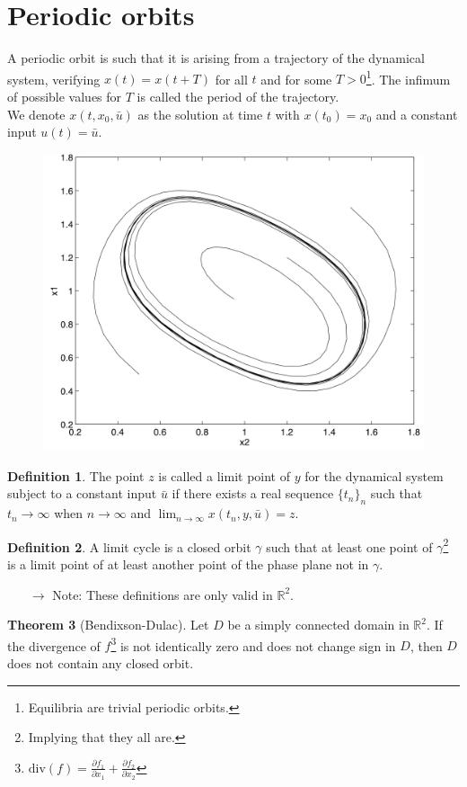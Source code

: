 \documentclass[12pt, openany]{report}
\theoremstyle{definition}
\newtheorem{thm}{Theorem}[chapter]
\newtheorem{definition}[thm]{Definition}
\newcommand{\R}{\mathbb{R}}
\begin{document}
\section{Periodic orbits}
A periodic orbit is such that it is arising from a trajectory of the dynamical system, verifying \(x(t)=x(t+T)\) for all \(t\) and for some \(T>0\)\footnote{Equilibria are trivial periodic orbits.}. The infimum of possible values for \(T\) is called the period of the trajectory.\\
We denote \(x(t,x_0,\bar u)\) as the solution at time \(t\) with \(x(t_0)=x_0\) and a constant input \(u(t) = \bar u\).
\begin{figure}[H]
    \centering
    \includegraphics[width = .5\textwidth]{img/limit_cycle.png}
\end{figure}
\begin{definition}
    The point \(z\) is called a limit point of \(y\) for the dynamical system subject to a constant input \(\bar u\) if there exists a real sequence \(\{t_n\}_n\) such that \(t_n\rightarrow\infty\) when \(n\rightarrow \infty\) and \(\lim_{n\rightarrow\infty}x(t_n,y,\bar u)=z\).
\end{definition}
\begin{definition}
    A limit cycle is a closed orbit \(\gamma\) such that at least one point of \(\gamma\)\footnote{Implying that they all are.} is a limit point of at least another point of the phase plane not in \(\gamma\).
\end{definition}
\begin{itemize}
    \item [\(\rightarrow\)] Note: These definitions are only valid in \(\R^2\).
\end{itemize}
\begin{thm}[Bendixson-Dulac]
    Let \(D\) be a simply connected domain in \(\R^2\). If the divergence of \(f\)\footnote{\(\text{div}(f) = \frac{\partial f_1}{\partial x_1}+\frac{\partial f_2}{\partial x_2}\)} is not identically zero and does not change sign in \(D\), then \(D\) does not contain any closed orbit. 
\end{thm}
\end{document}
